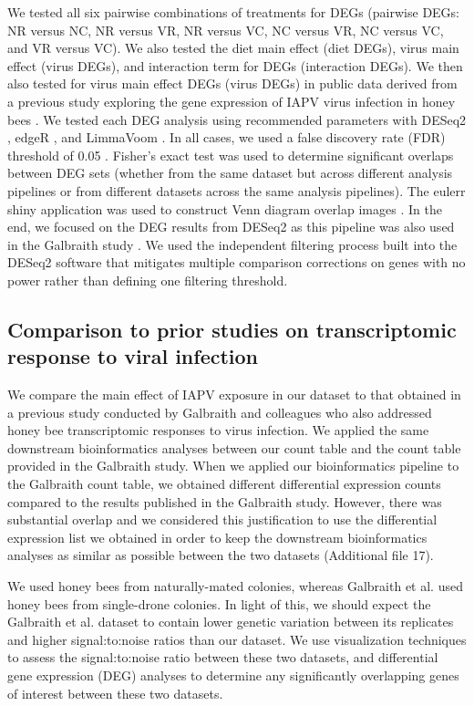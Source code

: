 \documentclass{bmcart}
\begin{document}
\begin{linenumbers}
\begin{doublespacing}
We tested all six pairwise combinations of treatments for DEGs (pairwise DEGs: NR versus NC, NR versus VR, NR versus VC, NC versus VR, NC versus VC, and VR versus VC). We also tested the diet main effect (diet DEGs), virus main effect (virus DEGs), and interaction term for DEGs (interaction DEGs). We then also tested for virus main effect DEGs (virus DEGs) in public data derived from a previous study exploring the gene expression of IAPV virus infection in honey bees \cite{galbraith}. We tested each DEG analysis using recommended parameters with DESeq2 \cite{deseq2}, edgeR \cite{edger}, and LimmaVoom \cite{limma}. In all cases, we used a false discovery rate (FDR) threshold of 0.05 \cite{benjamini}. Fisher's exact test was used to determine significant overlaps between DEG sets (whether from the same dataset but across different analysis pipelines or from different datasets across the same analysis pipelines). The eulerr shiny application was used to construct Venn diagram overlap images \cite{euler}. In the end, we focused on the DEG results from DESeq2 \cite{deseq2} as this pipeline was also used in the Galbraith study \cite{galbraith}. We used the independent filtering process built into the DESeq2 software that mitigates multiple comparison corrections on genes with no power rather than defining one filtering threshold.

\subsection*{Comparison to prior studies on transcriptomic response to viral infection}

We compare the main effect of IAPV exposure in our dataset to that obtained in a previous study conducted by Galbraith and colleagues \cite{galbraith} who also addressed honey bee transcriptomic responses to virus infection. We applied the same downstream bioinformatics analyses between our count table and the count table provided in the Galbraith study. When we applied our bioinformatics pipeline to the Galbraith count table, we obtained different differential expression counts compared to the results published in the Galbraith study. However, there was substantial overlap and we considered this justification to use the differential expression list we obtained in order to keep the downstream bioinformatics analyses as similar as possible between the two datasets (Additional file 17). 

We used honey bees from naturally-mated colonies, whereas Galbraith et al. \cite{galbraith} used honey bees from single-drone colonies. In light of this, we should expect the Galbraith et al. dataset to contain lower genetic variation between its replicates and higher signal:to:noise ratios than our dataset. We use visualization techniques to assess the signal:to:noise ratio between these two datasets, and differential gene expression (DEG) analyses to determine any significantly overlapping genes of interest between these two datasets.


\end{doublespacing}
\end{linenumbers}
\end{document}
